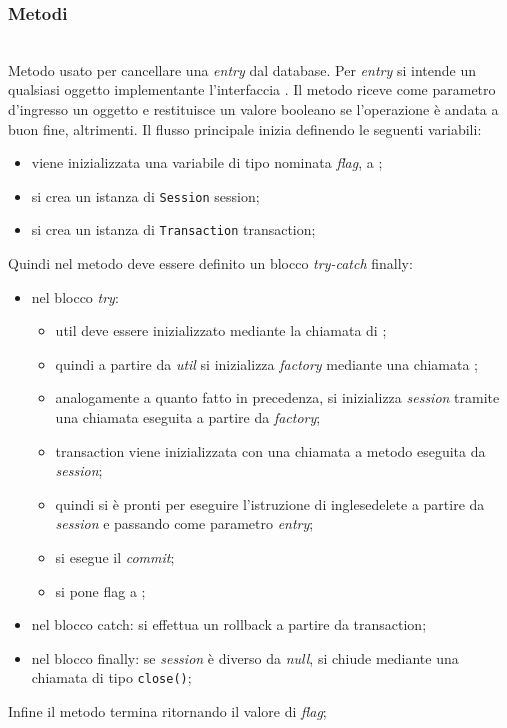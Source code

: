 \subsubsection*{Metodi}

\begin{description}
	\item{}\\
	Metodo usato per cancellare una \textit{entry} dal database. Per \textit{entry} si intende un qualsiasi oggetto implementante l'interfaccia . Il metodo riceve come parametro d'ingresso un oggetto  e restituisce un valore booleano  se l'operazione è andata a buon fine,  altrimenti. Il flusso principale inizia definendo le seguenti variabili:
	\begin{itemize}
		\item viene inizializzata una variabile di tipo  nominata \textit{flag}, a ;
		\item si crea un istanza di \texttt{Session} session;
		\item si crea un istanza di \texttt{Transaction} transaction;
	\end{itemize}
	Quindi nel metodo deve essere definito un blocco \textit{try-catch} finally:
	\begin{itemize}
		\item nel blocco \textit{try}:
		\begin{itemize}
			\item util deve essere inizializzato mediante la chiamata  di ;
			\item quindi a partire da \textit{util} si inizializza \textit{factory} mediante una chiamata ;
			\item analogamente a quanto fatto in precedenza, si inizializza \textit{session} tramite una chiamata  eseguita a partire da \textit{factory};
			\item transaction viene inizializzata con una chiamata a metodo  eseguita da \textit{session};
			\item quindi si è pronti per eseguire l'istruzione di inglese{delete} a partire da \textit{session} e passando come parametro \textit{entry};
			\item si esegue il \textit{commit};
			\item si pone flag a ;
		\end{itemize}
		\item nel blocco catch: si effettua un rollback a partire da transaction;
		\item nel blocco finally: se \textit{session} è diverso da \textit{null}, si chiude mediante una chiamata di tipo \texttt{close()};
	\end{itemize}
	Infine il metodo termina ritornando il valore di \textit{flag};
	

\end{description}
